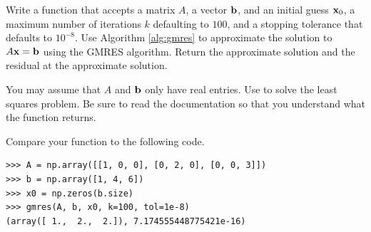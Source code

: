 
\begin{problem}
Write a function that accepts a matrix $A$, a vector $\mathbf{b}$, and an initial guess $\mathbf{x}_0$, a maximum number of iterations $k$ defaulting to $100$, and a stopping tolerance  that defaults to $10^{-8}$.
Use Algorithm \ref{alg:gmres} to approximate the solution to $A\mathbf{x}=\mathbf{b}$ using the GMRES algorithm.
Return the approximate solution and the residual at the approximate solution.

You may assume that $A$ and $\mathbf{b}$ only have real entries.
Use  to solve the least squares problem.
Be sure to read the documentation so that you understand what the function returns.

Compare your function to the following code.
\begin{lstlisting}
>>> A = np.array([[1, 0, 0], [0, 2, 0], [0, 0, 3]])
>>> b = np.array([1, 4, 6])
>>> x0 = np.zeros(b.size)
>>> gmres(A, b, x0, k=100, tol=1e-8)
(array([ 1.,  2.,  2.]), 7.174555448775421e-16)
\end{lstlisting}
\label{prob:MyGMRES}
\end{problem}

